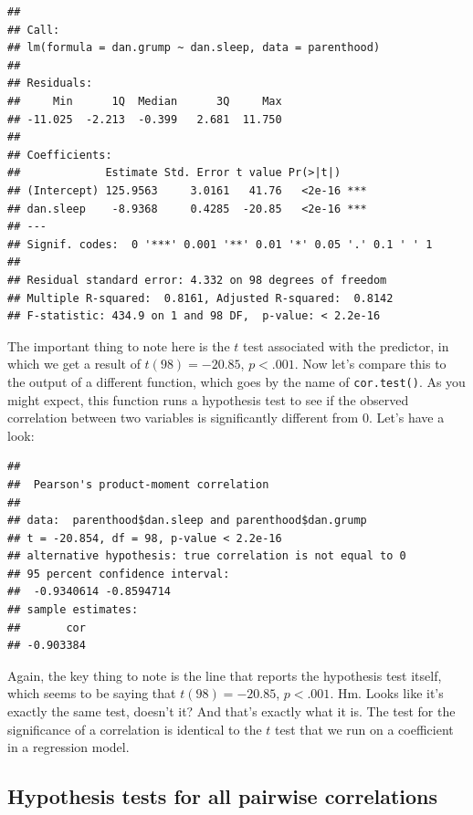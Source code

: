 \documentclass[
]{book}
\newenvironment{Shaded}{\begin{snugshade}}{\end{snugshade}}
\newcommand{\AttributeTok}[1]{\textcolor[rgb]{0.77,0.63,0.00}{#1}}
\newcommand{\FunctionTok}[1]{\textcolor[rgb]{0.00,0.00,0.00}{#1}}
\newcommand{\NormalTok}[1]{#1}
\newcommand{\SpecialCharTok}[1]{\textcolor[rgb]{0.00,0.00,0.00}{#1}}
\begin{document}
\begin{verbatim}
## 
## Call:
## lm(formula = dan.grump ~ dan.sleep, data = parenthood)
## 
## Residuals:
##     Min      1Q  Median      3Q     Max 
## -11.025  -2.213  -0.399   2.681  11.750 
## 
## Coefficients:
##             Estimate Std. Error t value Pr(>|t|)    
## (Intercept) 125.9563     3.0161   41.76   <2e-16 ***
## dan.sleep    -8.9368     0.4285  -20.85   <2e-16 ***
## ---
## Signif. codes:  0 '***' 0.001 '**' 0.01 '*' 0.05 '.' 0.1 ' ' 1
## 
## Residual standard error: 4.332 on 98 degrees of freedom
## Multiple R-squared:  0.8161, Adjusted R-squared:  0.8142 
## F-statistic: 434.9 on 1 and 98 DF,  p-value: < 2.2e-16
\end{verbatim}

The important thing to note here is the \(t\) test associated with the predictor, in which we get a result of \(t(98) = -20.85\), \(p<.001\). Now let's compare this to the output of a different function, which goes by the name of \texttt{cor.test()}. As you might expect, this function runs a hypothesis test to see if the observed correlation between two variables is significantly different from 0. Let's have a look:

\begin{Shaded}
\end{Shaded}

\begin{verbatim}
## 
##  Pearson's product-moment correlation
## 
## data:  parenthood$dan.sleep and parenthood$dan.grump
## t = -20.854, df = 98, p-value < 2.2e-16
## alternative hypothesis: true correlation is not equal to 0
## 95 percent confidence interval:
##  -0.9340614 -0.8594714
## sample estimates:
##       cor 
## -0.903384
\end{verbatim}

Again, the key thing to note is the line that reports the hypothesis test itself, which seems to be saying that \(t(98) = -20.85\), \(p<.001\). Hm. Looks like it's exactly the same test, doesn't it? And that's exactly what it is. The test for the significance of a correlation is identical to the \(t\) test that we run on a coefficient in a regression model.

\hypertarget{corrhyp2}{%
\subsection{Hypothesis tests for all pairwise correlations}\label{corrhyp2}}
\end{document}
